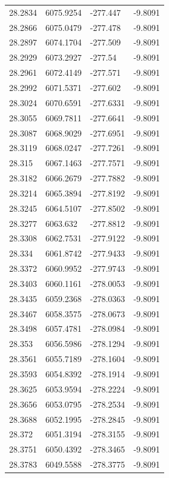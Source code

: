 \begin{table}[H]
\begin{tabular}{llll}
28.2834 & 6075.9254 & -277.447 & -9.8091 \\
28.2866 & 6075.0479 & -277.478 & -9.8091 \\
28.2897 & 6074.1704 & -277.509 & -9.8091 \\
28.2929 & 6073.2927 & -277.54 & -9.8091 \\
28.2961 & 6072.4149 & -277.571 & -9.8091 \\
28.2992 & 6071.5371 & -277.602 & -9.8091 \\
28.3024 & 6070.6591 & -277.6331 & -9.8091 \\
28.3055 & 6069.7811 & -277.6641 & -9.8091 \\
28.3087 & 6068.9029 & -277.6951 & -9.8091 \\
28.3119 & 6068.0247 & -277.7261 & -9.8091 \\
28.315 & 6067.1463 & -277.7571 & -9.8091 \\
28.3182 & 6066.2679 & -277.7882 & -9.8091 \\
28.3214 & 6065.3894 & -277.8192 & -9.8091 \\
28.3245 & 6064.5107 & -277.8502 & -9.8091 \\
28.3277 & 6063.632 & -277.8812 & -9.8091 \\
28.3308 & 6062.7531 & -277.9122 & -9.8091 \\
28.334 & 6061.8742 & -277.9433 & -9.8091 \\
28.3372 & 6060.9952 & -277.9743 & -9.8091 \\
28.3403 & 6060.1161 & -278.0053 & -9.8091 \\
28.3435 & 6059.2368 & -278.0363 & -9.8091 \\
28.3467 & 6058.3575 & -278.0673 & -9.8091 \\
28.3498 & 6057.4781 & -278.0984 & -9.8091 \\
28.353 & 6056.5986 & -278.1294 & -9.8091 \\
28.3561 & 6055.7189 & -278.1604 & -9.8091 \\
28.3593 & 6054.8392 & -278.1914 & -9.8091 \\
28.3625 & 6053.9594 & -278.2224 & -9.8091 \\
28.3656 & 6053.0795 & -278.2534 & -9.8091 \\
28.3688 & 6052.1995 & -278.2845 & -9.8091 \\
28.372 & 6051.3194 & -278.3155 & -9.8091 \\
28.3751 & 6050.4392 & -278.3465 & -9.8091 \\
28.3783 & 6049.5588 & -278.3775 & -9.8091 \\

\end{tabular}
\end{table}
